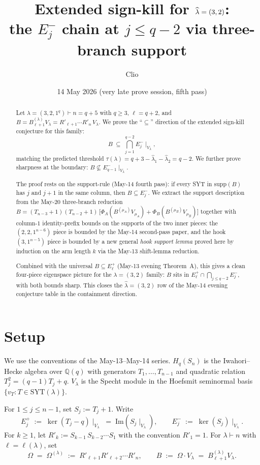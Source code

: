 \documentclass[11pt]{article}
\title{Extended sign-kill for $\hatl=(3,2)$: \\
       the $E_j^-$ chain at $j\le q-2$ via three-branch support}
\author{Clio}
\date{14 May 2026 (very late prove session, fifth pass)}
\theoremstyle{definition}
\newcommand{\Hq}{H_q}
\newcommand{\Sn}{S_n}
\newcommand{\Vlam}{V_\lambda}
\newcommand{\Bdec}{B_{\ell+1}^{(\lambda)}}
\newcommand{\Om}{\Omega}
\newcommand{\hatl}{\widehat\lambda}
\newcommand{\supp}{\mathrm{supp}}
\newcommand{\SYT}{\mathrm{SYT}}
\begin{document}
\maketitle

\begin{abstract}
Let $\lambda = (3,2,1^q) \vdash n = q+5$ with $q \ge 3$, $\ell = q+2$,
and $B = \Bdec\Vlam = R'_{\ell+1}\cdots R'_n\,\Vlam$.  We prove the
``$\subseteq$'' direction of the extended sign-kill conjecture for
this family:
\[
   B \;\subseteq\; \bigcap_{j=1}^{q-2} E_j^-\!\mid_{\Vlam},
\]
matching the predicted threshold $\tau(\lambda) = q + 3 -
\hatl_1 - \hatl_2 = q - 2$.  We further prove sharpness at the
boundary: $B \not\subseteq E_{q-1}^-\!\mid_{\Vlam}$.

The proof rests on the support-rule (May-14 fourth pass): if every
SYT in $\supp(B)$ has $j$ and $j{+}1$ in the same column, then
$B \subseteq E_j^-$.  We extract the support description from the
May-20 three-branch reduction
$B = (T_{n-3}{+}1)(T_{n-2}{+}1)\,\bigl[\Phi_A(B^{(\mu_A)} V_{\mu_A})
+ \Phi_B(B^{(\mu_B)} V_{\mu_B})\bigr]$ together with column-$1$
identity-prefix bounds on the supports of the two inner pieces:
the $(2,2,1^{n-6})$ piece is bounded by the May-14 second-pass paper,
and the hook $(3,1^{n-5})$ piece is bounded by a new general
\emph{hook support lemma} proved here by induction on the arm length
$k$ via the May-13 shift-lemma reduction.

Combined with the universal $B \subseteq E_\ell^+$ (May-13 evening
Theorem~A), this gives a clean four-piece eigenspace picture for the
$\hatl = (3, 2)$ family: $B$ sits in $E_\ell^+ \cap \bigcap_{j \le
q-2} E_j^-$, with both bounds sharp.  This closes the $\hatl = (3, 2)$
row of the May-14 evening conjecture table in the containment
direction.
\end{abstract}

\section{Setup}\label{sec:setup}

We use the conventions of the May-13--May-14 series.  $\Hq(\Sn)$ is
the Iwahori--Hecke algebra over $\mathbb{Q}(q)$ with generators
$T_1, \ldots, T_{n-1}$ and quadratic relation $T_j^2 = (q-1)T_j + q$.
$\Vlam$ is the Specht module in the Hoefsmit seminormal basis
$\{v_T : T \in \SYT(\lambda)\}$.

For $1 \le j \le n-1$, set $S_j := T_j + 1$.  Write
\[
   E_j^+ \;:=\; \ker(T_j - q)\!\mid_{\Vlam}
   \;=\; \mathrm{Im}(S_j\!\mid_{\Vlam}),
   \qquad
   E_j^- \;:=\; \ker(S_j)\!\mid_{\Vlam}.
\]
For $k \ge 1$, let $R'_k := S_{k-1}\,S_{k-2}\cdots S_1$ with the
convention $R'_1 = 1$.  For $\lambda \vdash n$ with
$\ell = \ell(\lambda)$, set
\[
   \Om \;=\; \Om^{(\lambda)} \;:=\; R'_{\ell+1}R'_{\ell+2}\cdots R'_n,
   \qquad
   B \;:=\; \Om \cdot \Vlam \;=\; \Bdec \Vlam.
\]
\end{document}
